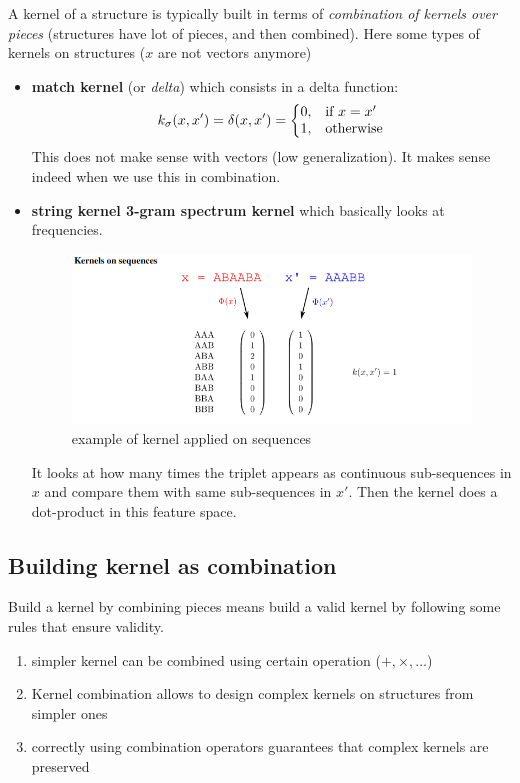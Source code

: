     A kernel of a structure is typically built in terms of \textit{combination of kernels over pieces} (structures have lot of pieces, and then combined). Here some types of kernels on structures ($x$ are not vectors anymore)
    \begin{itemize}
        \item \textbf{match kernel} (or \textit{delta}) which consists in a delta function: 
        \begin{equation}
          k_{\sigma} (x, x') = \delta(x, x') =\left\{
          \begin{array}{@{}ll@{}}
            0, & \text{if}\ x=x' \\
            1, & \text{otherwise}
          \end{array}\right.
        \end{equation} 
        This does not make sense with vectors (low generalization). It makes sense indeed when we use this in combination.
        \item \textbf{string kernel 3-gram spectrum kernel} which basically looks at frequencies.
        \begin{figure}[ht]
            \centering
            \includegraphics[scale=0.5]{images/string_kernel.png}
            \caption{example of kernel applied on sequences}
            \label{fig:string_kernel}
        \end{figure}
        It looks at how many times the triplet appears as continuous sub-sequences in $x$ and compare them with same sub-sequences in $x'$. Then the kernel does a dot-product in this feature space. 
    \end{itemize}

    \subsection{Building kernel as combination}
        Build a kernel by combining pieces means build a valid kernel by following some rules that ensure validity. 
        \begin{enumerate}
            \item simpler kernel can be combined using certain operation ($+, \times, \dots$) 
            \item Kernel combination allows to design complex kernels on structures from simpler ones
            \item correctly using combination operators guarantees that complex kernels are preserved
        \end{enumerate}

